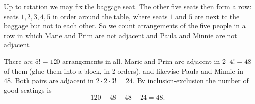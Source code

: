 Up to rotation we may fix the baggage seat. The other five seats then form a row: seats $1,2,3,4,5$ in order around the table, where seats $1$ and $5$ are next to the baggage but not to each other. So we count arrangements of the five people in a row in which Marie and Prim are not adjacent and Paula and Minnie are not adjacent.

There are $5!=120$ arrangements in all. Marie and Prim are adjacent in $2\cdot4!=48$ of them (glue them into a block, in $2$ orders), and likewise Paula and Minnie in $48$. Both pairs are adjacent in $2\cdot2\cdot3!=24$. By inclusion-exclusion the number of good seatings is
\[
120-48-48+24=\boxed{48}.
\]

